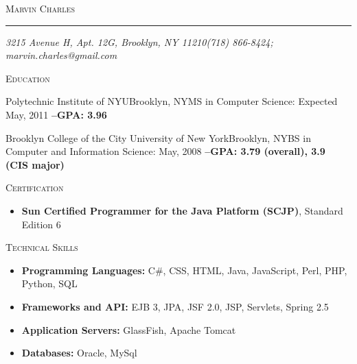 \documentclass[11pt,oneside]{article}
\makeatletter
\newcommand{\name}{Marvin Charles}
\newcommand{\addr}{3215 Avenue H, Apt. 12G, Brooklyn, NY 11210}
\newcommand{\phone}{(718) 866-8424}
\newcommand{\email}{marvin.charles@gmail.com}
\newcommand{\bigname}[1]{
	\begin{center}\fontfamily{phv}\selectfont\LARGE\scshape#1\end{center}
}
\newenvironment{ressection}[1]{
	\vspace{4pt}
	{\fontfamily{phv}\selectfont\large\scshape#1}
	\begin{itemize}
	\vspace{3pt}
}{
	\end{itemize}
}
\newcommand{\resitem}[1]{
	\vspace{-5pt}
	\item \begin{flushleft} #1 \end{flushleft}
}
\newcommand{\ressubitem}[1]{
	\vspace{-2pt}
	\item \begin{flushleft} #1 \end{flushleft}
}
\makeatother
\begin{document}
 \selectfont

\bigname{\name}

\vspace{-8pt} \rule{\textwidth}{1pt}

\vspace{-1pt} {\small\itshape \addr \hfill \phone; \email}

\vspace{12 pt}






\begin{ressection}{Education}

	\begin{ressubsecnoitems}{Polytechnic Institute of NYU}{Brooklyn, NY}{MS in Computer Science: Expected May, 2011 \textbf{--GPA: 3.96}}
	\end{ressubsecnoitems}

	\begin{ressubsecnoitems}{Brooklyn College of the City University of New York}{Brooklyn, NY}{BS in Computer and Information Science: May, 2008 \textbf{--GPA: 3.79 (overall), 3.9 (CIS major)}}
	\end{ressubsecnoitems}

\end{ressection}

\begin{ressection}{Certification}

	\resitem{\textbf{Sun Certified Programmer for the Java Platform (SCJP)}, Standard Edition 6}

\end{ressection}

\begin{ressection}{Technical Skills}


	\resitem{\textbf{Programming Languages:} C\#, CSS, HTML, Java, JavaScript, Perl, PHP, Python, SQL}

	\resitem{\textbf{Frameworks and API:} EJB 3, JPA, JSF 2.0, JSP, Servlets, Spring 2.5}
	
	\resitem{\textbf{Application Servers:} GlassFish, Apache Tomcat }
	\resitem{\textbf{Databases:} Oracle, MySql }

\end{ressection}
\end{document}
